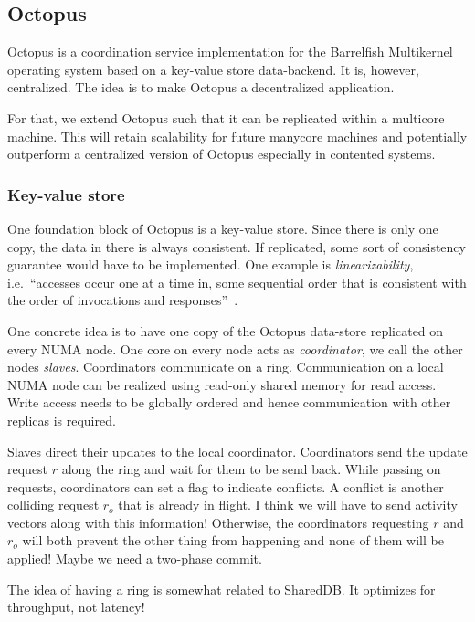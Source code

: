 \documentclass{article}
\begin{document}
\subsection{Octopus}

Octopus is a coordination service implementation for the Barrelfish
Multikernel operating system based on a key-value store
data-backend. It is, however, centralized. The idea is to make Octopus
a decentralized application.

For that, we extend Octopus such that it can be replicated within a
multicore machine. This will retain scalability for future manycore
machines and potentially outperform a centralized version of Octopus
especially in contented systems.

\subsubsection{Key-value store}

One foundation block of Octopus is a key-value store. Since there is
only one copy, the data in there is always consistent. If replicated,
some sort of consistency guarantee would have to be implemented. One
example is \emph{linearizability}, i.e.\ ``accesses occur one at a time
in, some sequential order that is consistent with the order of
invocations and responses''~\cite{lynch}.

One concrete idea is to have one copy of the Octopus data-store
replicated on every NUMA node. One core on every node acts as
\emph{coordinator}, we call the other nodes \emph{slaves}.
Coordinators communicate on a ring. Communication on a local NUMA node
can be realized using read-only shared memory for read access. Write
access needs to be globally ordered and hence communication with other
replicas is required. 

Slaves direct their updates to the local coordinator. Coordinators
send the update request $r$ along the ring and wait for them to be
send back. While passing on requests, coordinators can set a flag to
indicate conflicts. A conflict is another colliding request $r_o$ that
is already in flight. I think we will have to send activity vectors
along with this information! Otherwise, the coordinators requesting
$r$ and $r_o$ will both prevent the other thing from happening and
none of them will be applied! Maybe we need a two-phase commit.

The idea of having a ring is somewhat related to SharedDB. It
optimizes for throughput, not latency!
\end{document}
